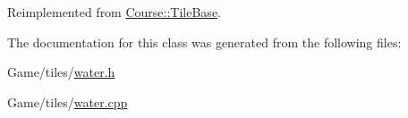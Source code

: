 Reimplemented from \hyperlink{classCourse_1_1TileBase_af1a8aaa3407ad3ade7ffe8f2fb421288}{Course\-::\-Tile\-Base}.



The documentation for this class was generated from the following files\-:\begin{DoxyCompactItemize}
\item 
Game/tiles/\hyperlink{water_8h}{water.\-h}\item 
Game/tiles/\hyperlink{water_8cpp}{water.\-cpp}\end{DoxyCompactItemize}
